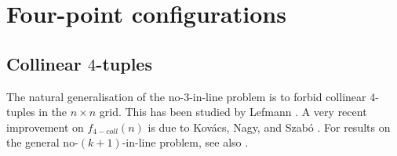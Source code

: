 \documentclass[11pt]{article}
\theoremstyle{plain}
\newcommand\cP{{\mathcal P}}
\begin{document}

	
	\section{Four-point configurations}
	
	
	
	\subsection{Collinear $4$-tuples}
	
	The natural generalisation of the no-$3$-in-line problem is to forbid collinear $4$-tuples in the $n\times n$ grid. This has been studied by  Lefmann \cite{Lefmann}. A very recent improvement on $f_{4-coll}(n)$ is due to Kovács, Nagy, and Szabó \cite{knsz}. For results on the general  no-$(k+1)$-in-line problem, see also \cite{kwan, kovacs2025settling}. 
	
\end{document}
